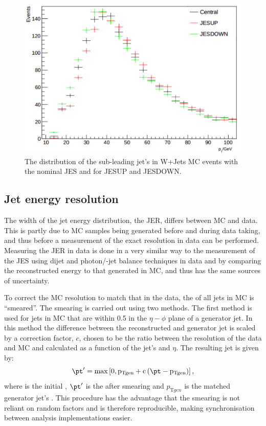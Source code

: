 \begin{figure}
  \includegraphics[width=\largefigwidth]{plots/prompt/jescheckzoom.png}
  \caption{The distribution of the sub-leading jet's \pt in W+Jets \ac{MC} events with the nominal \ac{JES} and for JESUP and JESDOWN.}
  \label{fig:promptjes}
\end{figure}

\subsection{Jet energy resolution}
\label{sec:promptjer}
The width of the jet energy distribution, the \ac{JER}, differs between \ac{MC} and data. This is partly due to \ac{MC} samples being generated before and during data taking, and thus before a measurement of the exact resolution in data can be performed. Measuring the \ac{JER} in data is done in a very similar way to the measurement of the \ac{JES} using dijet and photon/\PZ-jet balance techniques in data and by comparing the reconstructed energy to that generated in \ac{MC}, and thus has the same sources of uncertainty.

To correct the \ac{MC} resolution to match that in the data, the \pt of all jets in \ac{MC} is ``smeared''. The smearing is carried out using two methods. The first method is used for jets in \ac{MC} that are within 0.5 in the $\eta-\phi$ plane of a generator jet. In this method the difference between the reconstructed and generator jet \pt is scaled by a correction factor, $c$, chosen to be the ratio between the resolution of the data and \ac{MC} and calculated as a function of the jet's \pt and $\eta$. The resulting jet \pt is given by:
\begin{equation}
  \label{eq:promptjermatched}
  \pt'=\rm{max}\left[0,p_{\mathrm{T}gen}+c\left(\pt-p_{\mathrm{T}gen}\right)\right],
\end{equation}
where \pt is the initial \pt, $\pt'$ is the \pt after smearing and $p_{\mathrm{T}gen}$ is the matched generator jet's \pt. This procedure has the advantage that the smearing is not reliant on random factors and is therefore reproducible, making synchronisation between analysis implementations easier.

